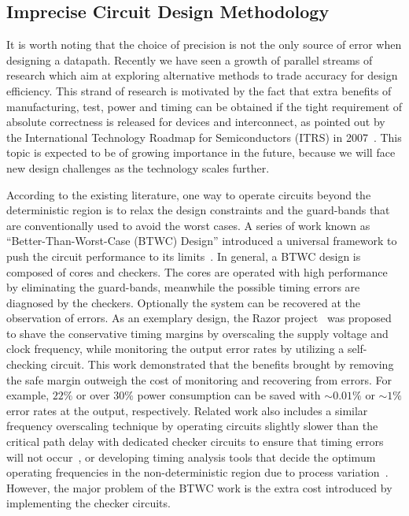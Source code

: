\documentclass[prodmode,acmtrets]{acmsmall} %
\begin{document}

\subsection{Imprecise Circuit Design Methodology}\label{Section_Background_Imprecise}
It is worth noting that the choice of precision is not the only source of error when designing a datapath. Recently we have seen a growth of parallel streams of research which aim at exploring alternative methods to trade accuracy for design efficiency. This strand of research is motivated by the fact that extra benefits of manufacturing, test, power and timing can be obtained if the tight requirement of absolute correctness is released for devices and interconnect, as pointed out by the International Technology Roadmap for Semiconductors (ITRS) in 2007~\cite{semiconductor2007international}. This topic is expected to be of growing importance in the future, because we will face new design challenges as the technology scales further.

According to the existing literature, one way to operate circuits beyond the deterministic region is to relax the design constraints and the guard-bands that are conventionally used to avoid the worst cases. A series of work known as ``Better-Than-Worst-Case (BTWC) Design'' introduced a universal framework to push the circuit performance to its limits~\cite{BetterThanWS2005}. In general, a BTWC design is composed of cores and checkers. The cores are operated with high performance by eliminating the guard-bands, meanwhile the possible timing errors are diagnosed by the checkers. Optionally the system can be recovered at the observation of errors. As an exemplary design, the Razor project~\cite{Razor2003,Razor2004} was proposed to shave the conservative timing margins by overscaling the supply voltage and clock frequency, while monitoring the output error rates by utilizing a self-checking circuit. This work demonstrated that the benefits brought by removing the safe margin outweigh the cost of monitoring and recovering from errors. For example, $22\%$ or over $30\%$ power consumption can be saved with $\sim0.01\%$ or $\sim1\%$ error rates at the output, respectively. Related work also includes a similar frequency overscaling technique by operating circuits slightly slower than the critical path delay with dedicated checker circuits to ensure that timing errors will not occur~\cite{TEAtime2004}, or developing timing analysis tools that decide the optimum operating frequencies in the non-deterministic region due to process variation~\cite{ProbabilisticSTA}. However, the major problem of the BTWC work is the extra cost introduced by implementing the checker circuits.
\end{document}
